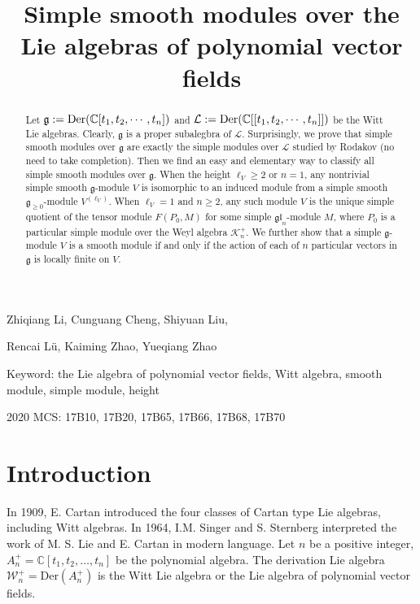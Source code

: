 \documentclass[12pt, a4paper]{amsart}
\def\gl{\mathfrak{gl}}
\theoremstyle{Theorem}
\theoremstyle{Theorem}
\numberwithin{equation}{section}
\begin{document}
 

\title[Simple smooth modules]{Simple smooth modules over  the Lie algebras of polynomial vector fields}
\maketitle

\centerline{Zhiqiang Li,  Cunguang Cheng,  Shiyuan Liu,  }
\centerline{Rencai Lü,   Kaiming Zhao,  Yueqiang Zhao}


\begin{abstract}
	Let $\mathfrak{g}:={\rm Der}(\mathbb{C}[t_1, t_2,\cdots, t_n])$ and $\mathcal{L}:={\rm Der}(\mathbb{C}[[t_1, t_2,\cdots, t_n]])$ be the Witt Lie algebras. Clearly, $\mathfrak{g}$ is a proper subalegbra of  $\mathcal{L}$.
	Surprisingly, we prove that simple smooth modules over $\mathfrak{g}$ are exactly the simple modules over $\mathcal{L}$ studied by Rodakov (no need to take completion). Then we find an easy and elementary way to classify all  simple smooth modules over $\mathfrak{g}$. When the height $\ell_{V}\geq2$ or $n=1$, any nontrivial simple smooth
	$\mathfrak{g}$-module $V$ is isomorphic to an induced module  from a simple smooth $\mathfrak{g}_{\geq0}$-module $V^{(\ell_{V})}$.   When $\ell_{V}=1$ and $n\geq2$, any such module $V$ is the unique simple quotient of the tensor module $F(P_{0},M)$ for some simple $\gl_{n}$-module $M$, where $P_0$ is a particular simple module over the Weyl algebra $\mathcal{K}^+_n$.
	We further show that a simple   $\mathfrak{g}$-module $V$ is a smooth module if and only if the action  of each of $n$ particular vectors in  $\mathfrak{g}$ is locally finite on $V$.
\end{abstract}


Keyword: 	the Lie algebra of polynomial vector fields, Witt algebra, smooth module, simple module, height

2020 MCS: 17B10, 17B20, 17B65, 17B66, 17B68, 17B70




\section{Introduction}
In 1909, E. Cartan introduced the four classes of Cartan type Lie algebras, including Witt algebras. In 1964, I.M. Singer and S. Sternberg interpreted the work of M. S. Lie and E. Cartan  \cite{SS} in modern language. Let $n $ be a positive  integer, $A_{n}^{+}=\mathbb{C}[t_{1},t_{2},\dots,t_{n}]$ be the polynomial algebra. The derivation Lie algebra $\mathcal{W}_{n}^{+}=\text{Der}(A_{n}^{+})$ is the Witt Lie algebra or  the Lie algebra of polynomial vector fields.
\end{document}

